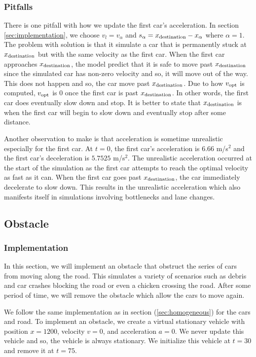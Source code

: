 \documentclass[12pt]{article}
\begin{document}
    \subsubsection{Pitfalls}\label{sec:homogeneous_pitfal}
    There is one pitfall with how we update the first car's acceleration. In section \ref{sec:implementation}, we choose $v_l = v_\alpha$ and $s_\alpha = x_{\rm destination} - x_\alpha$ where $\alpha = 1$. The problem with solution is that it simulate a car that is permanently stuck at $x_{\rm destination}$ but with the same velocity as the first car. When the first car approaches $x_{\rm destination}$, the model predict that it is safe to move past $x_{\rm destination}$ since the simulated car has non-zero velocity and so, it will move out of the way. This does not happen and so, the car move past $x_{\rm destination}$. Due to how $v_{\rm opt}$ is computed, $v_{\rm opt}$ is $0$ once the first car is past $x_{\rm destination}$. In other words, the first car does eventually slow down and stop. It is better to state that $x_{\rm destination}$ is when the first car will begin to slow down and eventually stop after some distance.  
      
    Another observation to make is that acceleration is sometime unrealistic especially for the first car. At $t=0$, the first car's acceleration is $6.66$ m/s$^2$ and the first car's deceleration is $5.7525$ m/s$^2$. The unrealistic acceleration occurred at the start of the simulation as the first car attempts to reach the optimal velocity as fast as it can. When the first car goes past $x_{\rm destination}$, the car immediately decelerate to slow down. This results in the unrealistic acceleration which also manifests itself in simulations involving bottlenecks and lane changes. 
    \subsection{Obstacle}
    \subsubsection{Implementation}
    In this section, we will implement an obstacle that obstruct the series of cars from moving along the road. This simulates a variety of scenarios such as debris and car crashes blocking the road or even a chicken crossing the road. After some period of time, we will remove the obstacle which allow the cars to move again. 

    We follow the same implementation as in section (\ref{sec:homogeneous}) for the cars and road. To implement an obstacle, we create a virtual stationary vehicle with position $x=1200$, velocity $v=0$, and acceleration $a=0$. We never update this vehicle and so, the vehicle is always stationary. We initialize this vehicle at $t=30$ and remove it at $t=75$. 
\end{document}
